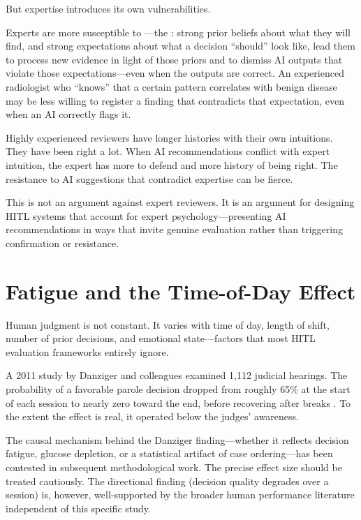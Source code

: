 But expertise introduces its own vulnerabilities.

Experts are more susceptible to ---the : strong prior beliefs about what they will find, and strong expectations about what a decision ``should'' look like, lead them to process new evidence in light of those priors and to dismiss AI outputs that violate those expectations---even when the outputs are correct. An experienced radiologist who ``knows'' that a certain pattern correlates with benign disease may be less willing to register a finding that contradicts that expectation, even when an AI correctly flags it.

Highly experienced reviewers have longer histories with their own intuitions. They have been right a lot. When AI recommendations conflict with expert intuition, the expert has more to defend and more history of being right. The resistance to AI suggestions that contradict expertise can be fierce.

This is not an argument against expert reviewers. It is an argument for designing HITL systems that account for expert psychology---presenting AI recommendations in ways that invite genuine evaluation rather than triggering confirmation or resistance.

\section{Fatigue and the Time-of-Day Effect}

Human judgment is not constant. It varies with time of day, length of shift, number of prior decisions, and emotional state---factors that most HITL evaluation frameworks entirely ignore.

A 2011 study by Danziger and colleagues examined 1,112 judicial hearings. The probability of a favorable parole decision dropped from roughly 65\% at the start of each session to nearly zero toward the end, before recovering after breaks \autocite{danziger2011extraneous}. To the extent the effect is real, it operated below the judges' awareness.

\begin{technote}
The causal mechanism behind the Danziger finding---whether it reflects decision fatigue, glucose depletion, or a statistical artifact of case ordering---has been contested in subsequent methodological work. The precise effect size should be treated cautiously. The directional finding (decision quality degrades over a session) is, however, well-supported by the broader human performance literature independent of this specific study.
\end{technote}


